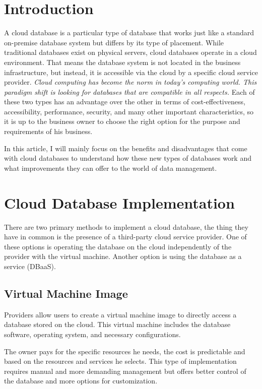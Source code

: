 \documentclass[12pt, a4paper]{article}
\begin{document}
\section{Introduction}
    A cloud database is a particular type of database that works just like a standard on-premise database system but differs by its type of placement. While traditional databases exist on physical servers, cloud databases operate in a cloud environment. That means the database system is not located in the business infrastructure, but instead, it is accessible via the cloud by a specific cloud service provider. \textit{Cloud computing has become the norm in today's computing world. This paradigm shift is looking for databases that are compatible in all respects.}\cite{03} Each of these two types has an advantage over the other in terms of cost-effectiveness, accessibility, performance, security, and many other important characteristics, so it is up to the business owner to choose the right option for the purpose and requirements of his business. \par In this article, I will mainly focus on the benefits and disadvantages that come with cloud databases to understand how these new types of databases work and what improvements they can offer to the world of data management.
\clearpage

\section{Cloud Database Implementation}
    There are two primary methods to implement a cloud database, the thing they have in common is the presence of a third-party cloud service provider. One of these options is operating the database on the cloud independently of the provider with the virtual machine. Another option is using the database as a service (DBaaS).
    
    \subsection{Virtual Machine Image}
        Providers allow users to create a virtual machine image to directly access a database stored on the cloud. This virtual machine includes the database software, operating system, and necessary configurations.\par The owner pays for the specific resources he needs, the cost is predictable and based on the resources and services he selects. This type of implementation requires manual and more demanding management but offers better control of the database and more options for customization.
    
\end{document}
